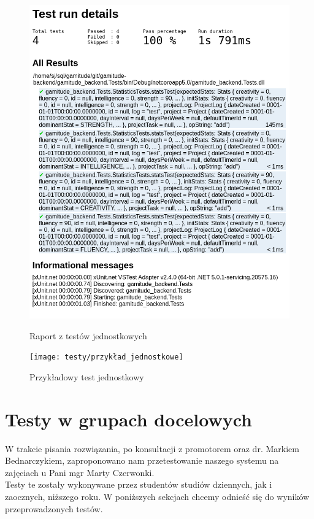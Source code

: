 \documentclass[a4paper,11pt]{report}
\begin{document}
\begin{figure}[H]
	\centering
	\includegraphics[scale=0.35]{testy/jednostkowe}\\
	\caption{Raport z testów jednostkowych}
	\label{fig:jednostkowe}
\end{figure}
\begin{figure}[H]
	\centering
	\texttt{[image: testy/przykład\_jednostkowe]}\\
	\caption{Przykładowy test jednostkowy}
	\label{fig:przykład_jednostkowe}
\end{figure}
\chapter {Testy w grupach docelowych}
W trakcie pisania rozwiązania, po konsultacji z promotorem oraz dr. Markiem Bednarczykiem,
 zaproponowano nam przetestowanie naszego systemu na zajęciach u Pani mgr Marty Czerwonki.\\
Testy te zostały wykonywane przez studentów studiów dziennych, jak i zaocznych, niższego roku.
W poniższych sekcjach chcemy odnieść się do wyników przeprowadzonych testów.\\
\end{document}
